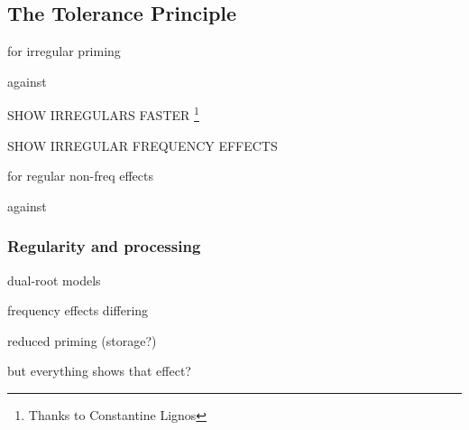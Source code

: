\subsection{The Tolerance Principle}

\citet{Yang2005a}
\citet{Legate2011}





for irregular priming
\citet{Emmorey1989}
\citet{Allen2002}
\citet{Stockall2006}

against
\citet{Stanners1979}
\citet{Marslen-Wilson1993}

\citet{ELP}

SHOW IRREGULARS FASTER
\footnote{Thanks to Constantine Lignos}

SHOW IRREGULAR FREQUENCY EFFECTS

for regular non-freq effects
\citet{LignosSubmitted}

against
\citet{Alegre1999}
\citet{Gordon1999}
\citet{Baayen2008}

\subsubsection{Regularity and processing}

\citet{Yang2005a}

dual-root models \citet{Baayen1997b}

frequency effects differing

reduced priming (storage?)
\citet{Stanners1979}
\citet{Marslen-Wilson1993}

\citet{ODonnell2011a}
\citet{ODonnell2011b}

but everything shows that effect?

\citet{Alegre1999}
\citet{Gordon1999}


